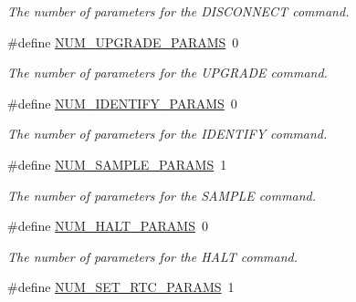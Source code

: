 \begin{DoxyCompactItemize}
\begin{DoxyCompactList}\small\item\em The number of parameters for the D\-I\-S\-C\-O\-N\-N\-E\-C\-T command. \end{DoxyCompactList}\item 
\hypertarget{group__command__interpreter_ga42bcbf56d92ed56e8a88c69e5d4cb4c0}{\#define \hyperlink{group__command__interpreter_ga42bcbf56d92ed56e8a88c69e5d4cb4c0}{N\-U\-M\-\_\-\-U\-P\-G\-R\-A\-D\-E\-\_\-\-P\-A\-R\-A\-M\-S}~0}\label{group__command__interpreter_ga42bcbf56d92ed56e8a88c69e5d4cb4c0}

\begin{DoxyCompactList}\small\item\em The number of parameters for the U\-P\-G\-R\-A\-D\-E command. \end{DoxyCompactList}\item 
\hypertarget{group__command__interpreter_ga6162173d76eb84687f453450c6973ed5}{\#define \hyperlink{group__command__interpreter_ga6162173d76eb84687f453450c6973ed5}{N\-U\-M\-\_\-\-I\-D\-E\-N\-T\-I\-F\-Y\-\_\-\-P\-A\-R\-A\-M\-S}~0}\label{group__command__interpreter_ga6162173d76eb84687f453450c6973ed5}

\begin{DoxyCompactList}\small\item\em The number of parameters for the I\-D\-E\-N\-T\-I\-F\-Y command. \end{DoxyCompactList}\item 
\hypertarget{group__command__interpreter_ga1fc6732ec779877a349a53c180c22c29}{\#define \hyperlink{group__command__interpreter_ga1fc6732ec779877a349a53c180c22c29}{N\-U\-M\-\_\-\-S\-A\-M\-P\-L\-E\-\_\-\-P\-A\-R\-A\-M\-S}~1}\label{group__command__interpreter_ga1fc6732ec779877a349a53c180c22c29}

\begin{DoxyCompactList}\small\item\em The number of parameters for the S\-A\-M\-P\-L\-E command. \end{DoxyCompactList}\item 
\hypertarget{group__command__interpreter_ga9998ef3c02f0f85f3f984b04ab30663d}{\#define \hyperlink{group__command__interpreter_ga9998ef3c02f0f85f3f984b04ab30663d}{N\-U\-M\-\_\-\-H\-A\-L\-T\-\_\-\-P\-A\-R\-A\-M\-S}~0}\label{group__command__interpreter_ga9998ef3c02f0f85f3f984b04ab30663d}

\begin{DoxyCompactList}\small\item\em The number of parameters for the H\-A\-L\-T command. \end{DoxyCompactList}\item 
\hypertarget{group__command__interpreter_ga36e8fbb263e5a9243d52f56202b5e3ce}{\#define \hyperlink{group__command__interpreter_ga36e8fbb263e5a9243d52f56202b5e3ce}{N\-U\-M\-\_\-\-S\-E\-T\-\_\-\-R\-T\-C\-\_\-\-P\-A\-R\-A\-M\-S}~1}\label{group__command__interpreter_ga36e8fbb263e5a9243d52f56202b5e3ce}


\end{DoxyCompactItemize}
